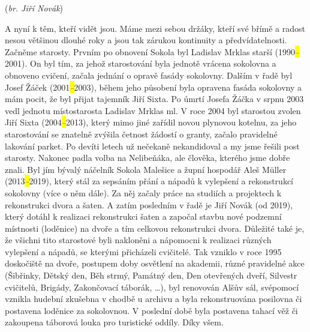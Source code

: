 (\emph{br. Jiří Novák})

A nyní k těm, kteří vidět jsou. Máme mezi sebou držáky, kteří své břímě
a radost nesou většinou dlouhé roky a jsou tak zárukou kontinuity a
předvídatelnosti. Začněme starosty. Prvním po obnovení Sokola byl
Ladislav Mrklas starší (1990\emph{\hl{--}}2001). On byl tím, za jehož
starostování byla jednotě vrácena sokolovna a obnoveno cvičení, začala
jednání o opravě fasády sokolovny. Dalším v řadě byl Josef Žáček
(2001\emph{\hl{--}}2003), během jeho působení byla opravena fasáda
sokolovny a mám pocit, že byl přijat tajemník Jiří Sixta. Po úmrtí
Josefa Žáčka v srpnu 2003 vedl jednotu místostarosta Ladislav Mrklas ml.
V roce 2004 byl starostou zvolen Jiří Sixta (2004\emph{\hl{--}}2013),
který mimo jiné zařídil novou plynovou kotelnu, za jeho starostování se
znatelně zvýšila četnost žádostí o granty, začalo pravidelné lakování
parket. Po devíti letech už nečekaně nekandidoval a my jsme řešili post
starosty. Nakonec padla volba na Nelibeňáka, ale člověka, kterého jsme
dobře znali. Byl jím bývalý náčelník Sokola Malešice a župní hospodář
Aleš Müller (2013\emph{\hl{--}}2019), který stál za sepsáním přání a
nápadů k vylepšení a rekonstrukcí sokolovny (více o něm dále). Za něj
začaly práce na studiích a projektech k rekonstrukci dvora a šaten. A
zatím posledním v řadě je Jiří Novák (od 2019), který dotáhl k realizaci
rekonstrukci šaten a započal stavbu nové podzemní místnosti (loděnice)
na dvoře a tím celkovou rekonstrukci dvora. Důležité také je, že všichni
tito starostové byli nakloněni a nápomocni k realizaci různých vylepšení
a nápadů, se kterými přicházeli cvičitelé. Tak vzniklo v roce 1995
doskočiště na dvoře, postupem doby osvětlení na akademii, různé
pravidelné akce (Šibřinky, Dětský den, Běh strmý, Památný den, Den
otevřených dveří, Silvestr cvičitelů, Brigády, Zakončovací táborák,
\ldots), byl renovován Alšův sál, svépomocí vznikla hudební zkušebna v
chodbě u archivu a byla rekonstruována posilovna či postavena loděnice
za sokolovnou. V poslední době byla postavena tahací věž či zakoupena
táborová louka pro turistické oddíly. Díky všem.

